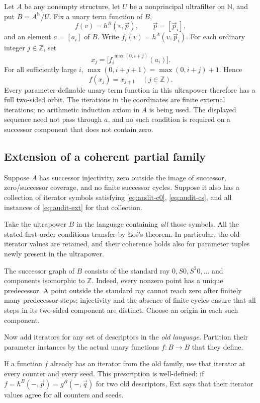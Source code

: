 \documentclass[11pt,letterpaper]{article}
\theoremstyle{definition}
\begin{document}
Let $A$ be any nonempty structure, let $U$ be a nonprincipal ultrafilter on
$\mathbb N$, and put $B=A^{\mathbb N}/U$. Fix a unary term function of $B$,
\[
 f(v)=h^B(v,\vec p),\qquad \vec p=[\vec p_i],
\]
and an element $a=[a_i]$ of $B$. Write
$f_i(v)=h^A(v,\vec p_i)$. For each ordinary integer $j\in\mathbb Z$, set
\[
 x_j=\bigl[f_i^{\,\max(0,i+j)}(a_i)\bigr].
\]
For all sufficiently large $i$,
$\max(0,i+j+1)=\max(0,i+j)+1$. Hence
\[
                         f(x_j)=x_{j+1}
                         \quad(j\in\mathbb Z).
\]
Every parameter-definable unary term function in this ultrapower therefore
has a full two-sided orbit. The iterations in the coordinates are finite
external iterations; no arithmetic induction axiom in $A$ is being used.
The displayed sequence need not pass through $a$, and no such condition is
required on a successor component that does not contain zero.

\subsection{Extension of a coherent partial family}

Suppose $A$ has successor injectivity, zero outside the image of successor,
zero/successor coverage, and no finite successor cycles. Suppose it also has
a collection of iterator symbols satisfying
\eqref{eq:audit-c0}, \eqref{eq:audit-cs}, and all instances of
\eqref{eq:audit-ext} for that collection.

Take the ultrapower $B$ in the language containing \emph{all} those symbols.
All the stated first-order conditions transfer by \L o\'s's theorem.
In particular, the old iterator values are retained, and their coherence
holds also for parameter tuples newly present in the ultrapower.

The successor graph of $B$ consists of the standard ray
$0,S0,S^2 0,\ldots$ and components isomorphic to $\mathbb Z$.
Indeed, every nonzero point has a unique predecessor. A point outside the
standard ray cannot reach zero after finitely many predecessor steps;
injectivity and the absence of finite cycles ensure that all steps in its
two-sided component are distinct. Choose an origin in each such component.

Now add iterators for any set of descriptors in the \emph{old language}.
Partition their parameter instances by the actual unary functions
$f:B\to B$ that they define.

If a function $f$ already has an iterator from the old family, use that
iterator at every counter and every seed. This prescription is well-defined:
if $f=h^B(-,\vec p)=g^B(-,\vec q)$ for two old descriptors, Ext says that
their iterator values agree for all counters and seeds.
\end{document}
